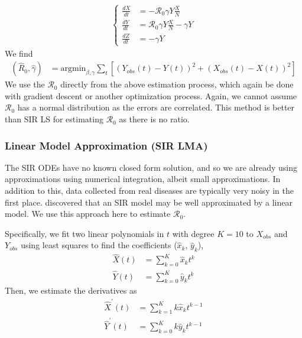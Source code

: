 \documentclass[12pt]{article}
\newcommand{\rr}{\ensuremath{\mathcal{R}_0}}
\begin{document}
\begin{align*}
  \left \{
  \begin{array}{cl}
    \frac{dX}{dt} &= - \rr \gamma Y \frac{X}{N}\\
    \frac{dY}{dt} &=  \rr \gamma Y \frac{X}{N}  - \gamma Y \\
    \frac{dZ}{dt} &=  - \gamma Y 
  \end{array}
  \right .
  \end{align*}
We find
\begin{align*}
(\hat{R}_0, \hat{\gamma} ) &= \text{argmin}_{\beta, \gamma} \sum_{t} \left [ \left (Y_{obs}(t) - Y(t)\right )^2 + \left ( X_{obs}(t) - X(t) \right )^2 \right ]
\end{align*}
We use the \(\rr\) directly from the above estimation process, which again be done with gradient descent or another optimization process.  Again, we cannot assume $\rr$ has a normal distribution as the errors are correlated.  This method is better than SIR LS for estimating $\rr$ as there is no ratio.



\subsubsection{Linear Model Approximation (SIR LMA)}\label{linear-model-approximation-degree-10}

The SIR ODEs have no known closed form solution, and so we are already using approximations using numerical integration, albeit small approximations.  In addition to this, data collected from real diseases are typically very noisy in the first place.  \cite{chang2017} discovered that an SIR model may be well approximated by a linear model.  We use this approach here to estimate $\rr$.

Specifically, we fit two linear polynomials in \(t\) with degree \(K= 10\) to \(X_{obs}\)
and \(Y_{obs}\) using least squares to find the coefficients (\(\hat{x}_k\),
\(\hat{y}_k\)),
\begin{align*}
\hat{X}(t) &= \sum_{k=0}^K \hat{x}_k t^k\\
{\hat{Y}}(t) &= \sum_{k=0}^K \hat{y}_k t^k
\end{align*}
Then, we estimate the derivatives as
\begin{align*}
\hat{X}^\prime(t) &= \sum_{k=1}^K k \hat{x}_k t^{k-1}\\
\hat{Y}^\prime(t) &= \sum_{k=0}^K k \hat{y}_k t^{k-1}
\end{align*}
\end{document}
